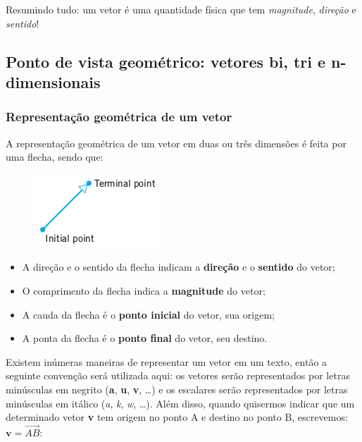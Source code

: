 \documentclass[pdftex, brazil, 12pt, twoside]{article}
\newcommand{\vet}[1]{\textbf{#1}}
\newcommand{\esc}[1]{\emph{#1}}
\begin{document}
Resumindo tudo: um vetor é uma quantidade física que tem \emph{magnitude},
\emph{direção} e \emph{sentido}!


\subsection{Ponto de vista geométrico: vetores bi, tri e n-dimensionais}
\label{evd-geom-bi-tri-n-dimen}

\subsubsection{Representação geométrica de um vetor}
\label{evd-geom-bi-tri-n-dimen-represent}

A representação geométrica de um vetor em duas ou três dimensões é feita por
uma flecha, sendo que:

\begin{figure}[H]
  \begin{center}
    \includegraphics[scale=0.6]{imagens/vet001.png}
  \end{center}
\end{figure}

\begin{itemize}[noitemsep]
\item A direção e o sentido da flecha indicam a \textbf{direção} e o
  \textbf{sentido} do vetor;
\item O comprimento da flecha indica a \textbf{magnitude} do vetor;
\item A cauda da flecha é o \textbf{ponto inicial} do vetor, sua origem;
\item A ponta da flecha é o \textbf{ponto final} do vetor, seu destino.
\end{itemize}

Existem inúmeras maneiras de representar um vetor em um texto, então a seguinte
convenção será utilizada aqui: os vetores serão representados por letras minúsculas
em negrito (\vet{a}, \vet{u}, \vet{v}, \ldots) e os escalares serão
representados por letras minúsculas em itálico (\esc{a}, \esc{k}, \esc{w}, \ldots).
Além disso, quando quisermos indicar que um determinado vetor \vet{v} tem origem
no ponto A e destino no ponto B, escrevemos: $\vet{v} = \overrightarrow{AB}$:
\end{document}

